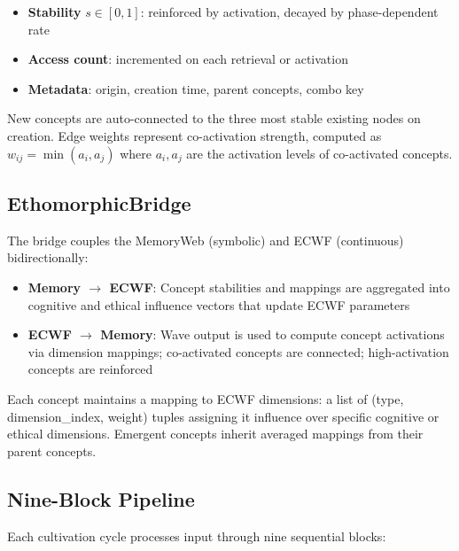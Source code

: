 \documentclass[11pt,a4paper]{article}
\begin{document}
\begin{itemize}[nosep]
    \item \textbf{Stability} $s \in [0, 1]$: reinforced by activation, decayed by phase-dependent rate
    \item \textbf{Access count}: incremented on each retrieval or activation
    \item \textbf{Metadata}: origin, creation time, parent concepts, combo key
\end{itemize}

New concepts are auto-connected to the three most stable existing nodes on creation. Edge weights represent co-activation strength, computed as $w_{ij} = \min(a_i, a_j)$ where $a_i, a_j$ are the activation levels of co-activated concepts.

\subsection{EthomorphicBridge}

The bridge couples the MemoryWeb (symbolic) and ECWF (continuous) bidirectionally:

\begin{itemize}[nosep]
    \item \textbf{Memory $\rightarrow$ ECWF}: Concept stabilities and mappings are aggregated into cognitive and ethical influence vectors that update ECWF parameters
    \item \textbf{ECWF $\rightarrow$ Memory}: Wave output is used to compute concept activations via dimension mappings; co-activated concepts are connected; high-activation concepts are reinforced
\end{itemize}

Each concept maintains a mapping to ECWF dimensions: a list of (type, dimension\_index, weight) tuples assigning it influence over specific cognitive or ethical dimensions. Emergent concepts inherit averaged mappings from their parent concepts.

\subsection{Nine-Block Pipeline}

Each cultivation cycle processes input through nine sequential blocks:
\end{document}
